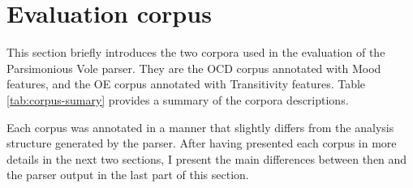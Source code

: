 \section{Evaluation corpus}
\label{sec:corpus}
    
    This section briefly introduces the two corpora used in the evaluation of the Parsimonious Vole parser. They are the OCD corpus annotated with Mood  features, and the OE corpus annotated with Transitivity features. Table \ref{tab:corpus-sumary} provides a summary of the corpora descriptions.  
    
    \begin{table}[!ht]
        \centering
        \caption{Evaluation corpus summary}
        \label{tab:corpus-sumary}
    \end{table}
    
    Each corpus was annotated in a manner that slightly differs from the analysis structure generated by the parser. After having presented each corpus in more details in the next two sections, I present the main differences between then and the parser output in the last part of this section. 
    

